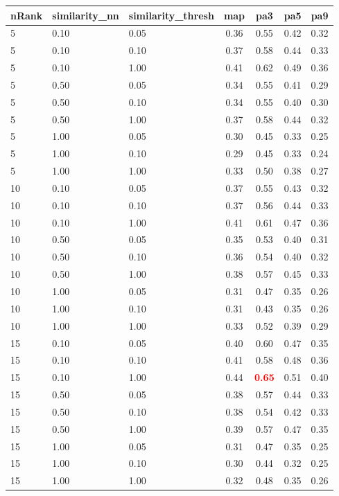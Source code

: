 \begin{tabular}{lllcccc} 
nRank & similarity\_nn & similarity\_thresh & map & pa3 & pa5 & pa9 \\ 
\hline 
 5 & 0.10 & 0.05 & 0.36 & 0.55 & 0.42 & 0.32 \\ 
 5 & 0.10 & 0.10 & 0.37 & 0.58 & 0.44 & 0.33 \\ 
 5 & 0.10 & 1.00 & 0.41 & 0.62 & 0.49 & 0.36 \\ 
 5 & 0.50 & 0.05 & 0.34 & 0.55 & 0.41 & 0.29 \\ 
 5 & 0.50 & 0.10 & 0.34 & 0.55 & 0.40 & 0.30 \\ 
 5 & 0.50 & 1.00 & 0.37 & 0.58 & 0.44 & 0.32 \\ 
 5 & 1.00 & 0.05 & 0.30 & 0.45 & 0.33 & 0.25 \\ 
 5 & 1.00 & 0.10 & 0.29 & 0.45 & 0.33 & 0.24 \\ 
 5 & 1.00 & 1.00 & 0.33 & 0.50 & 0.38 & 0.27 \\ 
10 & 0.10 & 0.05 & 0.37 & 0.55 & 0.43 & 0.32 \\ 
10 & 0.10 & 0.10 & 0.37 & 0.56 & 0.44 & 0.33 \\ 
10 & 0.10 & 1.00 & 0.41 & 0.61 & 0.47 & 0.36 \\ 
10 & 0.50 & 0.05 & 0.35 & 0.53 & 0.40 & 0.31 \\ 
10 & 0.50 & 0.10 & 0.36 & 0.54 & 0.40 & 0.32 \\ 
10 & 0.50 & 1.00 & 0.38 & 0.57 & 0.45 & 0.33 \\ 
10 & 1.00 & 0.05 & 0.31 & 0.47 & 0.35 & 0.26 \\ 
10 & 1.00 & 0.10 & 0.31 & 0.43 & 0.35 & 0.26 \\ 
10 & 1.00 & 1.00 & 0.33 & 0.52 & 0.39 & 0.29 \\ 
15 & 0.10 & 0.05 & 0.40 & 0.60 & 0.47 & 0.35 \\ 
15 & 0.10 & 0.10 & 0.41 & 0.58 & 0.48 & 0.36 \\ 
15 & 0.10 & 1.00 & 0.44 & \textbf{\textcolor{red}{0.65}} & 0.51 & 0.40 \\ 
15 & 0.50 & 0.05 & 0.38 & 0.57 & 0.44 & 0.33 \\ 
15 & 0.50 & 0.10 & 0.38 & 0.54 & 0.42 & 0.33 \\ 
15 & 0.50 & 1.00 & 0.39 & 0.57 & 0.47 & 0.35 \\ 
15 & 1.00 & 0.05 & 0.31 & 0.47 & 0.35 & 0.25 \\ 
15 & 1.00 & 0.10 & 0.30 & 0.44 & 0.32 & 0.25 \\ 
15 & 1.00 & 1.00 & 0.32 & 0.48 & 0.35 & 0.26 \\ 

\end{tabular}
